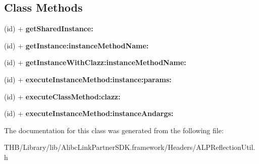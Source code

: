 \subsection*{Class Methods}
\begin{DoxyCompactItemize}
\item 
\mbox{\label{interface_a_l_p_reflection_util_a7505c2ff872f2aff05907c50a25fee04}} 
(id) + {\bfseries get\+Shared\+Instance\+:}
\item 
\mbox{\label{interface_a_l_p_reflection_util_a023e85a38a068e931b059825f3b69c9b}} 
(id) + {\bfseries get\+Instance\+:instance\+Method\+Name\+:}
\item 
\mbox{\label{interface_a_l_p_reflection_util_a2ded0f1705aaf73e48d748a5d1e1bf68}} 
(id) + {\bfseries get\+Instance\+With\+Clazz\+:instance\+Method\+Name\+:}
\item 
\mbox{\label{interface_a_l_p_reflection_util_aee963112e57d1b0f98c8f5b6baf964c9}} 
(id) + {\bfseries execute\+Instance\+Method\+:instance\+:params\+:}
\item 
\mbox{\label{interface_a_l_p_reflection_util_a736812af5763b5244d9b048fac4953c6}} 
(id) + {\bfseries execute\+Class\+Method\+:clazz\+:}
\item 
\mbox{\label{interface_a_l_p_reflection_util_a79ac917a28b09091045d8591a92eafcb}} 
(id) + {\bfseries execute\+Instance\+Method\+:instance\+Andargs\+:}
\end{DoxyCompactItemize}


The documentation for this class was generated from the following file\+:\begin{DoxyCompactItemize}
\item 
T\+H\+B/\+Library/lib/\+Alibc\+Link\+Partner\+S\+D\+K.\+framework/\+Headers/A\+L\+P\+Reflection\+Util.\+h\end{DoxyCompactItemize}
